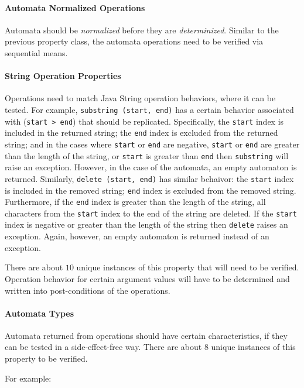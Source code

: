 \documentclass[letterpaper,11pt,twocolumn]{article}
\begin{document}
\paragraph{Automata Normalized Operations} Automata should be
\textit{normalized} before they are \textit{determinized}.  Similar to the
previous property class, the automata operations need to be verified via
sequential means.

\paragraph{String Operation Properties} Operations need to match Java String
operation behaviors, where it can be tested.  For example,
\texttt{substring~(start, end)} has a certain behavior associated with
(\texttt{start > end}) that should be replicated.  Specifically, the
\texttt{start} index is included in the returned string; the \texttt{end} index
is excluded from the returned string; and in the cases where \texttt{start} or
\texttt{end} are negative, \texttt{start} or \texttt{end} are greater than the
length of the string, or \texttt{start} is greater than \texttt{end} then
\texttt{substring} will raise an exception.  However, in the case of the
automata, an empty automaton is returned.  Similarly, \texttt{delete~(start,
  end)} has similar behaivor: the \texttt{start} index is included in the
removed string; \texttt{end} index is excluded from the removed string.
Furthermore, if the \texttt{end} index is greater than the length of the
string, all characters from the \texttt{start} index to the end of the string
are deleted.  If the \texttt{start} index is negative or greater than the
length of the string then \texttt{delete} raises an exception.  Again, however,
an empty automaton is returned instead of an exception.

There are about \(10\) unique instances of this property that will need to be
verified.  Operation behavior for certain argument values will have to be
determined and written into post-conditions of the operations.

\paragraph{Automata Types} Automata returned from operations should have certain
characteristics, if they can be tested in a side-effect-free way.  There are
about \(8\) unique instances of this property to be verified.

For example:
\end{document}
